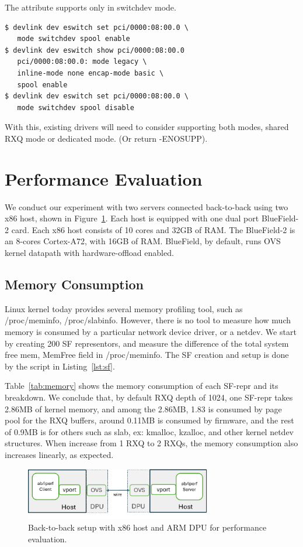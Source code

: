 \documentclass[letterpaper]{article}
\begin{document}
The attribute supports only in switchdev mode.
\begin{Verbatim}[fontsize=\small]
$ devlink dev eswitch set pci/0000:08:00.0 \
   mode switchdev spool enable
$ devlink dev eswitch show pci/0000:08:00.0
   pci/0000:08:00.0: mode legacy \
   inline-mode none encap-mode basic \
   spool enable
$ devlink dev eswitch set pci/0000:08:00.0 \
   mode switchdev spool disable
\end{Verbatim}

With this, existing drivers will need to consider supporting both
modes, shared RXQ mode or dedicated mode. (Or return -ENOSUPP).

\section{Performance Evaluation}

We conduct our experiment with two servers connected back-to-back using
two x86 host, shown in Figure~\ref{fig:testbed}.
Each host is equipped with one dual port BlueField-2 card.
Each x86 host consists of 10 cores and 32GB of RAM. The BlueField-2
is an 8-cores Cortex-A72, with 16GB of RAM. BlueField, by default, runs OVS kernel
datapath with hardware-offload enabled.

\subsection{Memory Consumption}
Linux kernel today provides several memory profiling tool, such as /proc/meminfo,
/proc/slabinfo. However, there is no tool to measure how much memory is consumed
by a particular network device driver, or a netdev. We start by creating 200 SF representors,
and measure the difference of the total system free mem, MemFree field in /proc/meminfo.
The SF creation and setup is done by the script in Listing~\ref{lst:sf}.

Table~\ref{tab:memory} shows the memory consumption of each SF-repr and its breakdown.
We conclude that, by default RXQ depth of 1024, one SF-repr takes 2.86MB of kernel
memory, and among the 2.86MB, 1.83 is consumed by page pool for the RXQ buffers,
around 0.11MB is consumed by firmware, and the rest of 0.9MB is for others
such as slab, ex: kmalloc, kzalloc, and other kernel netdev structures.
When increase from 1 RXQ to 2 RXQs, the memory consumption also increases linearly, as expected.
\begin{figure}[t!]
\includegraphics[width=3.2in]{testbed.pdf}
\centering
\caption{Back-to-back setup with x86 host and ARM DPU for performance evaluation.}
\label{fig:testbed}
\end{figure}
\end{document}
